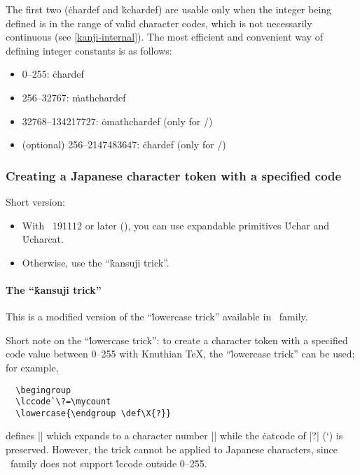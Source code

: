 \documentclass[a4paper,11pt,dvipdfmx]{article}
\begin{document}
The first two (\.{chardef} and \.{kchardef}) are usable only when
the integer being defined is in the range of valid character codes,
which is not necessarily continuous (see \ref{kanji-internal}).
The most efficient and convenient way of defining integer constants
is as follows:
\begin{itemize}
 \item 0--255: \.{chardef}
 \item 256--32767: \.{mathchardef}
 \item 32768--134217727: \.{omathchardef} (only for \epTeX/\eupTeX)
 \item (optional) 256--2147483647: \.{chardef} (only for \upTeX/\eupTeX)
\end{itemize}

\subsubsection{Creating a Japanese character token with a specified code}\label{jtoken-tricks}

Short version:
\begin{itemize}
 \item With \epTeX~191112 or later (),
   you can use expandable primitives \.{Uchar} and \.{Ucharcat}.
 \item Otherwise, use the ``\.{kansuji} trick''.
\end{itemize}

\paragraph{The ``\.{kansuji} trick''}
This is a modified version of the ``\.{lowercase} trick''
available in \pTeX\ family.

\begin{dangerous}
Short note on the ``\.{lowercase} trick'':
to create a character token with a specified code value between 0--255
with Knuthian \TeX, the ``\.{lowercase} trick'' can be used; for example,
\begin{verbatim}
  \begingroup
  \lccode`\?=\mycount
  \lowercase{\endgroup \def\X{?}}
\end{verbatim}
defines |\X| which expands to a character number |\mycount|
while the \.{catcode} of |?| (\the\catcode`\?) is preserved.
However, the trick cannot be applied to Japanese characters,
since \pTeX\ family does not support \.{lccode} outside 0--255.
\end{dangerous}
\end{document}
